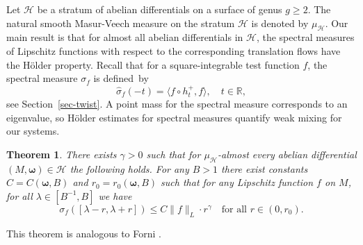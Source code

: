 \documentclass[11pt]{article}
\numberwithin{equation}{section}\newcommand{\Relation}[2][]{}\newtheorem*{prop*}{Proposition}
\let\mathcal\mathscr
\theoremstyle{plain}
\newtheorem{theorem}{Theorem}[section]
\theoremstyle{definition}
\newcommand{\omb}{\boldsymbol \omega}
\let\lam\lambda
\let\sig\sigma
\newcommand{\HH}{\mathcal{H}}
\newcommand{\R}{\mathbb{R}}
\newcommand\be{\begin{equation}}
\newcommand\ee{\end{equation}}
\begin{document}
Let $\HH$ be a stratum of abelian differentials on a surface of genus $g\ge 2$. The natural smooth Masur-Veech measure on the stratum $\HH$ is denoted by $\mu_\HH$.
Our main result is
that for almost all abelian differentials in $\HH$, the spectral measures of Lipschitz functions with respect to the corresponding translation flows have the Hölder property.
Recall that for a square-integrable test function $f$, the spectral measure $\sig_f$ is defined~by\vspace*{-5pt}\enlargethispage{.5\baselineskip}%
\[
\widehat{\sig}_f(-t) = \langle f\circ h_t^+, f \rangle,\quad t\in \R,
\]
see Section~\ref{sec-twist}.
A point mass for the spectral measure corresponds to an eigenvalue, so Hölder estimates for spectral measures quantify weak mixing for our systems.

\begin{theorem}\label{main-moduli}
There exists $\gamma>0$ such that for $\mu_\HH$-almost every abelian differential $(M, \omb)\in \HH$ the following holds. For any $B>1$ there exist constants $C=C(\omb,B)$ and $r_0=r_0(\omb,B)$ such that for any Lipschitz function $f$ on $M$, for all $\lam\in [B^{-1},B]$ we have\vspace*{-5pt}
\be \label{eq-moduli}
\sig_f([\lam-r, \lam+r])\le C\|f\|_L\cdot r^\gamma\quad\text{for all } r\in (0, r_0).
\ee
\end{theorem}

This theorem is analogous to Forni \cite[Cor.\,1.7]{Forni2}.
\end{document}
